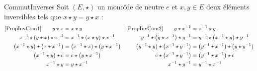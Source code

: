 \documentclass[12pt,a4paper]{report}
\begin{document}
    \begin{demonstration}{CommutInverses}
    Soit $(E, \star)$ un monoïde de neutre $e$ et $x, y \in E$ deux éléments inversibles tels que $x \star y = y \star x$ :
    \begin{align*}
        \text{\ref{PropInvCom1}} \qquad y \star x &= x \star y 
        & \text{\ref{PropInvCom2}} \qquad y \star x^{-1} &= x^{-1} \star y \\
        x^{-1} \star (y \star x) \star x^{-1} &= x^{-1} \star (x \star y) \star x^{-1}
        & y^{-1} \star \left(y \star x^{-1}\right) \star y^{-1} &= y^{-1} \star \left(x^{-1} \star y\right) \star y^{-1} \\
        \left(x^{-1} \star y\right) \star \left(x \star x^{-1}\right) &= \left(x^{-1} \star x\right) \star \left(y \star x^{-1}\right)
        & \left(y^{-1} \star y\right) \star \left(x^{-1} \star y^{-1}\right) &= \left(y^{-1} \star x^{-1}\right) \star \left(y \star y^{-1}\right) \\
        \left(x^{-1} \star y\right) \star e &= e \star \left(y \star x^{-1}\right)
        & e \star \left(x^{-1} \star y^{-1}\right) &= \left(y^{-1} \star x^{-1}\right) \star e \\
        x^{-1} \star y &= y \star x^{-1}
        & x^{-1} \star y^{-1} &= y^{-1} \star x^{-1}
    \end{align*}
    \end{demonstration}
    
\end{document}
